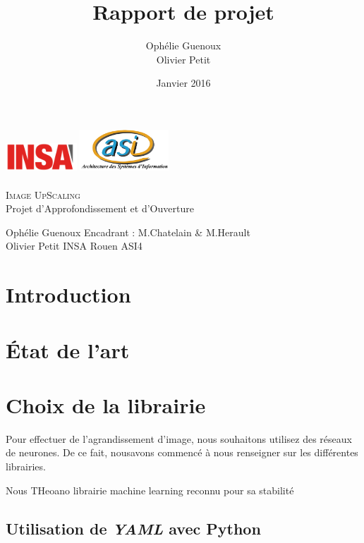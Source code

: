 \documentclass[12pt, a4paper]{article}
\title{Rapport de projet}
\author{Ophélie Guenoux \\Olivier Petit}
\date{Janvier 2016}
\begin{document}
\makeatletter
\begin{titlepage}
  \begin{center}
      \includegraphics[width=0.20\textwidth]{Images/Logo_INSA.png}
      \hfill
      \includegraphics[width=0.25\textwidth]{Images/logoasi.png}\\
    \vspace{1cm}
		\Huge \underline{\@title} 
			\\ \textsc{Image UpScaling}
			\\ \Large Projet d'Approfondissement et d'Ouverture
			\vspace{1cm}
			\begin{figure}[h!]
				\centering
			\end{figure}
	\vspace{1cm}
	\end{center}
	\raggedright
	\large Ophélie Guenoux \hfill Encadrant : M.Chatelain \& M.Herault
	\\Olivier Petit \hfill INSA Rouen ASI4
	
\end{titlepage}

\newpage
\tableofcontents
\newpage
\section*{Introduction}

\section{État de l'art}
\section{Choix de la librairie}
Pour effectuer de l'agrandissement d'image, nous souhaitons utilisez des réseaux de neurones. De ce fait, nousavons commencé à nous renseigner sur les différentes librairies. 

 Nous THeoano librairie machine learning reconnu pour sa stabilité
\subsection{Utilisation de \emph{YAML} avec Python}
\end{document}

